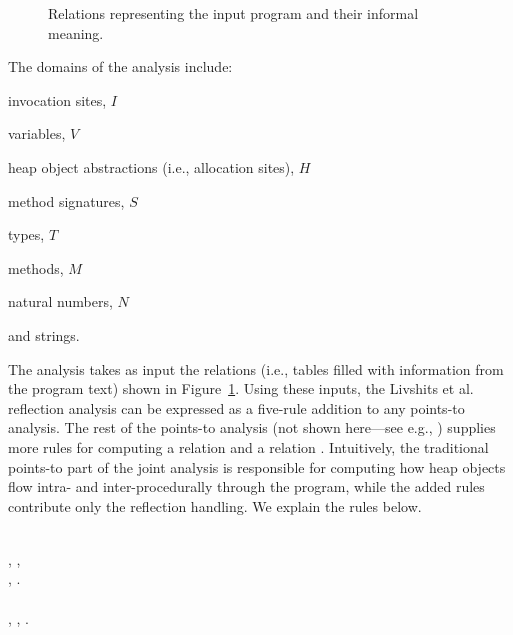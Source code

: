\begin{figure}[tb]
\caption{Relations representing the input program and their informal meaning.}
\label{reflection/figure:inputs}
\end{figure}

The domains of the analysis include:
\begin{compactitem}[\(\cdot\)]
\item invocation sites, \(I\)
\item variables, \(V\)
\item heap object abstractions (i.e., allocation sites), \(H\)
\item method signatures, \(S\)
\item types, \(T\)
\item methods, \(M\)
\item natural numbers, \(N\)
\item and strings.
\end{compactitem}
The analysis takes as input the relations (i.e., tables filled with
information from the program text) shown in
Figure~\ref{reflection/figure:inputs}.  Using these inputs, the
Livshits et al. reflection analysis can be expressed as a five-rule
addition to any points-to analysis. The rest of the points-to analysis
(not shown here---see e.g.,
\cite{uss/GuarnieriL09,pldi/KastrinisS13,aplas/WhaleyACL05}) supplies
more rules for computing a relation  and
a relation . Intuitively, the
traditional points-to part of the joint analysis is responsible for
computing how heap objects flow intra- and inter-procedurally through
the program, while the added rules contribute only the reflection
handling. We explain the rules below.

\begin{minipage}{0.95\columnwidth}
  \begin{rules}
      \\
    \tab    {}, , \\
    \tab    {}, .\\
      \\
    \tab {}, , .\\
  \end{rules}
\end{minipage}

